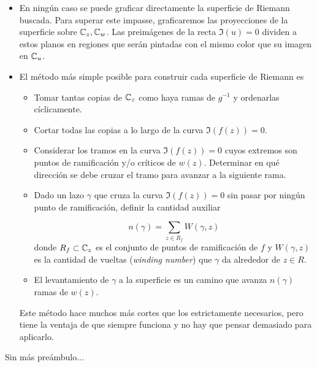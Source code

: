 \begin{solution}
\begin{itemize}
\begin{itemize}
        \item En ningún caso se puede graficar directamente la superficie de Riemann buscada. Para superar este impasse, graficaremos las proyecciones de la superficie sobre $\mathbb C_z, \mathbb C_w$. Las preimágenes de la recta $\Im(u) = 0$ dividen a estos planos en regiones que serán pintadas con el mismo color que su imagen en $\mathbb C_u$.
        
        \item El método más simple posible para construir cada superficie de Riemann es 
        \begin{itemize}
            \item Tomar tantas copias de $\mathbb C_z$ como haya ramas de $g^{-1}$ y ordenarlas cíclicamente.
            \item Cortar todas las copias a lo largo de la curva $\Im(f(z)) = 0$.
            \item Considerar los tramos en la curva $\Im(f(z)) = 0$ cuyos extremos son puntos de ramificación y/o críticos de $w(z)$. Determinar en qué dirección se debe cruzar el tramo para avanzar a la siguiente rama.
            \item Dado un lazo $\gamma$ que cruza la curva $\Im(f(z)) = 0$ sin pasar por ningún punto de ramificación, definir la cantidad auxiliar
            
            
            $$n(\gamma) = \sum_{z \in R_f} W(\gamma, z)$$
            donde $R_f \subset \mathbb C_z$ es el conjunto de puntos de ramificación de $f$ y $W(\gamma, z)$ es la cantidad de vueltas (\textit{winding number}) que $\gamma$ da alrededor de $z \in R$.
            \item El levantamiento de $\gamma$ a la superficie es un camino que avanza $n(\gamma)$ ramas de $w(z)$.
        \end{itemize}
        
        Este método hace muchos más cortes que los estrictamente necesarios, pero tiene la ventaja de que siempre funciona y no hay que pensar demasiado para aplicarlo.
    \end{itemize}
    
    Sin más preámbulo...
    

\end{itemize}
\end{solution}
